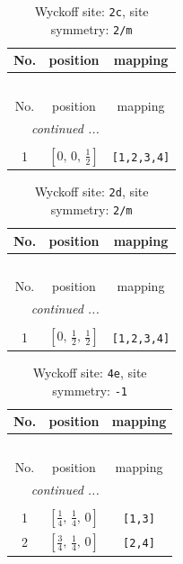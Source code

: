 \documentclass[fleqn,8pt]{jsarticle}
\begin{document}
\begin{longtable}{ccc}
\caption{Wyckoff site: {\tt 2c}, site symmetry: {\tt 2/m}}
 \\
 \hline \hline
No. & position & mapping \\ \hline \endfirsthead

\multicolumn{2}{l}{\tablename\ \thetable{}} \\
 \hline \hline
No. & position & mapping \\ \hline \endhead

 \hline \hline
\multicolumn{2}{r}{\footnotesize\it continued ...} \\ \endfoot

 \hline \hline
\multicolumn{2}{r}{} \\ \endlastfoot

1 & $\left[ 0,\, 0,\, \frac{1}{2} \right]$ & {\tt [1,2,3,4]} \\
\end{longtable}
\renewcommand{\arraystretch}{1.2}
\begin{longtable}{ccc}
\caption{Wyckoff site: {\tt 2d}, site symmetry: {\tt 2/m}}
 \\
 \hline \hline
No. & position & mapping \\ \hline \endfirsthead

\multicolumn{2}{l}{\tablename\ \thetable{}} \\
 \hline \hline
No. & position & mapping \\ \hline \endhead

 \hline \hline
\multicolumn{2}{r}{\footnotesize\it continued ...} \\ \endfoot

 \hline \hline
\multicolumn{2}{r}{} \\ \endlastfoot

1 & $\left[ 0,\, \frac{1}{2},\, \frac{1}{2} \right]$ & {\tt [1,2,3,4]} \\
\end{longtable}
\renewcommand{\arraystretch}{1.2}
\begin{longtable}{ccc}
\caption{Wyckoff site: {\tt 4e}, site symmetry: {\tt -1}}
 \\
 \hline \hline
No. & position & mapping \\ \hline \endfirsthead

\multicolumn{2}{l}{\tablename\ \thetable{}} \\
 \hline \hline
No. & position & mapping \\ \hline \endhead

 \hline \hline
\multicolumn{2}{r}{\footnotesize\it continued ...} \\ \endfoot

 \hline \hline
\multicolumn{2}{r}{} \\ \endlastfoot

1 & $\left[ \frac{1}{4},\, \frac{1}{4},\, 0 \right]$ & {\tt [1,3]} \\ \hline
2 & $\left[ \frac{3}{4},\, \frac{1}{4},\, 0 \right]$ & {\tt [2,4]} \\
\end{longtable}
\end{document}
